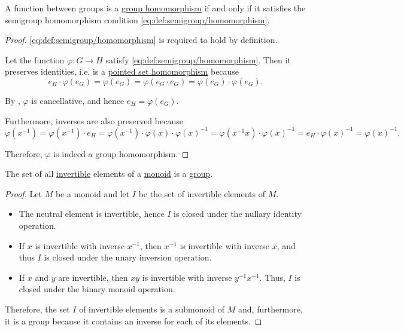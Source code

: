 \begin{proposition}\label{thm:group_homomorphism_single_condition}
  A function between groups is a \hyperref[def:group/homomorphism]{group homomorphism} if and only if it satisfies the semigroup homomorphism condition \eqref{eq:def:semigroup/homomorphism}.
\end{proposition}
\begin{proof}
  \SufficiencySubProof \eqref{eq:def:semigroup/homomorphism} is required to hold by definition.

  \NecessitySubProof Let the function \( \varphi: G \to H \) satisfy \eqref{eq:def:semigroup/homomorphism}. Then it preserves identities, i.e. is a \hyperref[def:pointed_set/homomorphism]{pointed set homomorphism} because
  \begin{equation*}
    e_H \cdot \varphi(e_G) = \varphi(e_G) = \varphi(e_G \cdot e_G) = \varphi(e_G) \cdot \varphi(e_G).
  \end{equation*}

  By , \( \varphi \) is cancellative, and hence \( e_H = \varphi(e_G) \).

  Furthermore, inverses are also preserved because
  \begin{equation*}
    \varphi(x^{-1})
    =
    \varphi(x^{-1}) \cdot e_H
    =
    \varphi(x^{-1}) \cdot \varphi(x) \cdot \varphi(x)^{-1}
    =
    \varphi(x^{-1} x) \cdot \varphi(x)^{-1}
    =
    e_H \cdot \varphi(x)^{-1}
    =
    \varphi(x)^{-1}.
  \end{equation*}

  Therefore, \( \varphi \) is indeed a group homomorphism.
\end{proof}

\begin{proposition}\label{thm:invertible_submonoid_is_group}
  The set of all \hyperref[def:monoid_inverse]{invertible} elements of a \hyperref[def:monoid]{monoid} is a \hyperref[def:group]{group}.
\end{proposition}
\begin{proof}
  Let \( M \) be a monoid and let \( I \) be the set of invertible elements of \( M \).

  \begin{itemize}
    \item The neutral element is invertible, hence \( I \) is closed under the nullary identity operation.
    \item If \( x \) is invertible with inverse \( x^{-1} \), then \( x^{-1} \) is invertible with inverse \( x \), and thus \( I \) is closed under the unary inversion operation.
    \item If \( x \) and \( y \) are invertible, then \( xy \) is invertible with inverse \( y^{-1} x^{-1} \). Thus, \( I \) is closed under the binary monoid operation.
  \end{itemize}

  Therefore, the set \( I \) of invertible elements is a submonoid of \( M \) and, furthermore, it is a group because it contains an inverse for each of its elements.
\end{proof}

